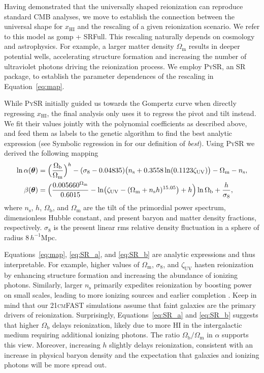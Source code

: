 \documentclass[12pt]{article}
\newcommand{\vtheta}{\boldsymbol{\theta}}
\newcommand{\ns}{n_\mathrm{s}}
\newcommand{\Omegam}{\Omega_\mathrm{m}}
\newcommand{\Omegab}{\Omega_\mathrm{b}}
\newcommand{\zetaUV}{\zeta_\mathrm{UV}}
\newcommand{\HI}{\mathrm{HI}}
\newcommand{\ap}{\alpha}
\begin{document}
Having demonstrated that the universally shaped reionization can
reproduce standard CMB analyses, we move to establish the connection
between the universal shape for $x_\HI$ and the rescaling of a given
reionization scenario.
We refer to this model as gomp + SRFull.
This rescaling naturally depends on cosmology and astrophysics.
For example, a larger matter density $\Omegam$ results in deeper
potential wells, accelerating structure formation and increasing the
number of ultraviolet photons driving the reionization process.
We employ \textsc{PySR}, an SR package, to establish the parameter
dependences of the rescaling in Equation~\eqref{eq:map}.

While \textsc{PySR} initially guided us towards the Gompertz curve when
directly regressing $x_\HI$, the final analysis only uses it to regress
the pivot and tilt instead.
We fit their values jointly with the polynomial coefficients as
described above, and feed them as labels to the genetic algorithm to
find the best analytic expression (see Symbolic regression in
\cite{methods} for our definition of \emph{best}).
Using \textsc{PySR} we derived the following mapping
%
\begin{align}
\label{eq:SR_a}
\ln\ap(\vtheta) &= \Bigl(\frac{\Omegab}{\Omegam}\Bigr)^h
  - (\sigma_8 - 0.04835) \bigl(\ns + 0.3558 \ln(0.1123 \zetaUV)\bigr)
  - \Omegam - \ns, \\
%
\label{eq:SR_b}
\beta(\vtheta) &= \Bigl( \frac{0.005660^{\Omegam}}{0.6015}
    - \ln\bigl(\zetaUV - (\Omegam + \ns h)^{15.05}\bigr) + h \Bigr)
  \ln{\Omegab} + \frac{h}{\sigma_8},
\end{align}
where $\ns$, $h$, $\Omegab$, and $\Omegam$ are the tilt of the
primordial power spectrum, dimensionless Hubble constant, and present
baryon and matter density fractions, respectively.
$\sigma_8$ is the present linear rms relative density fluctuation in a
sphere of radius $8 \, h^{-1}$Mpc.

Equations~\eqref{eq:map}, \eqref{eq:SR_a}, and \eqref{eq:SR_b} are analytic expressions and thus
interpretable.
For example, higher values of $\Omegam$, $\sigma_8$, and $\zetaUV$
hasten reionization by enhancing structure formation and increasing the
abundance of ionizing photons.
Similarly, larger $\ns$ primarily expedites reionization by boosting
power on small scales, leading to more ionizing sources and earlier
completion \cite{Montero2021}.
Keep in mind that our \textsc{21cmFAST} simulations assume that faint
galaxies are the primary drivers of reionization.
Surprisingly, Equations~\eqref{eq:SR_a} and \eqref{eq:SR_b} suggests that higher $\Omegab$
delays reionization, likely due to more HI in the intergalactic medium
requiring additional ionizing photons.
The ratio $\Omegab/\Omegam$ in $\alpha$ supports this view.
Moreover, increasing $h$ slightly delays reionization, consistent with
an increase in physical baryon density and
the expectation that galaxies and ionizing photons will be more spread
out.
\end{document}
